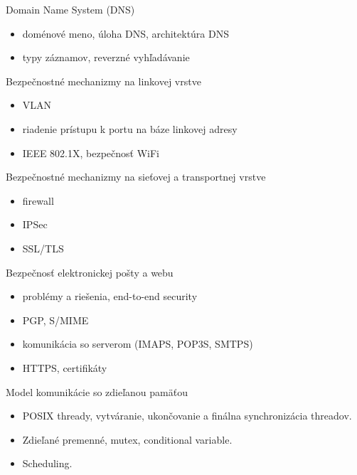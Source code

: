 \documentclass[a4paper]{report}
\begin{document}
\begin{zadanie}{Domain Name System (DNS)}
\begin{itemize}
 \item doménové meno, úloha DNS, architektúra DNS
 \item typy záznamov, reverzné vyhľadávanie
\end{itemize}
\end{zadanie}

\begin{zadanie}{Bezpečnostné mechanizmy na linkovej vrstve}
\begin{itemize}
 \item VLAN
 \item riadenie prístupu k portu na báze linkovej adresy
 \item IEEE 802.1X, bezpečnosť WiFi
\end{itemize}
\end{zadanie}

\begin{zadanie}{Bezpečnostné mechanizmy na sieťovej a transportnej vrstve}
\begin{itemize}
 \item firewall
 \item IPSec
 \item SSL/TLS
\end{itemize}
\end{zadanie}

\begin{zadanie}{Bezpečnosť elektronickej pošty a webu}
\begin{itemize}
 \item problémy a riešenia, end-to-end security
 \item PGP, S/MIME
 \item komunikácia so serverom (IMAPS, POP3S, SMTPS)
 \item HTTPS, certifikáty
\end{itemize}
\end{zadanie}

\begin{zadanie}{Model komunikácie so zdieľanou pamäťou}
\begin{itemize}
 \item POSIX thready, vytváranie, ukončovanie a finálna synchronizácia threadov.
 \item Zdieľané premenné, mutex, conditional variable.
 \item Scheduling.
\end{itemize}
\end{zadanie}
\end{document}
